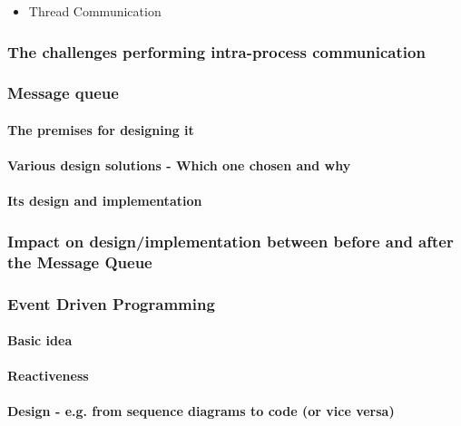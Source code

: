 \begin{itemize}
	\item Thread Communication
\end{itemize}

\newpage

\subsubsection{The challenges performing intra-process communication}

\subsubsection{Message queue}

\paragraph{The premises for designing it}

\paragraph{Various design solutions - Which one chosen and why}

\paragraph{Its design and implementation}

\subsubsection{Impact on design/implementation between before and after the Message Queue}

\subsubsection{Event Driven Programming}

\paragraph{Basic idea}

\paragraph{Reactiveness}

\paragraph{Design - e.g. from sequence diagrams to code (or vice versa)}
